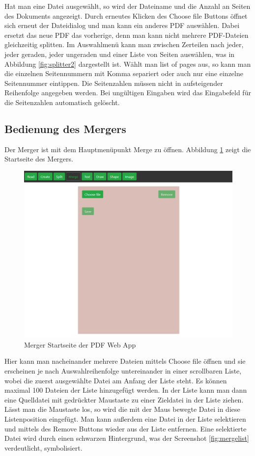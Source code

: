 Hat man eine Datei ausgewählt, so wird der Dateiname und die Anzahl an Seiten des Dokuments angezeigt. Durch erneutes Klicken des Choose file Buttons öffnet sich erneut der Dateidialog und man kann ein anderes PDF auswählen. Dabei ersetzt das neue PDF das vorherige, denn man kann nicht mehrere PDF-Dateien gleichzeitig splitten. Im Auswahlmenü kann man zwischen Zerteilen nach jeder, jeder geraden, jeder ungeraden und einer Liste von Seiten auswählen, was in Abbildung \ref{fig:splitter2} dargestellt ist. Wählt man list of pages aus, so kann man die einzelnen Seitennummern mit Komma separiert oder auch nur eine einzelne Seitennummer eintippen. Die Seitenzahlen müssen nicht in aufsteigender Reihenfolge angegeben werden. Bei ungültigen Eingaben wird das Eingabefeld für die Seitenzahlen automatisch gelöscht. 

\subsection{Bedienung des Mergers}
Der Merger ist mit dem Hauptmenüpunkt Merge zu öffnen. Abbildung \ref{fig:merger} zeigt die Startseite des Mergers. 

\begin{figure}[!htbp]
	\centering
	\includegraphics[width=1\textwidth]{"images/merger.png"}
	\caption{Merger Startseite der PDF Web App}
	\label{fig:merger}
\end{figure}

Hier kann man nacheinander mehrere Dateien mittels Choose file öffnen und sie erscheinen je nach Auswahlreihenfolge untereinander in einer scrollbaren Liste, wobei die zuerst ausgewählte Datei am Anfang der Liste steht. Es können maximal 100 Dateien der Liste hinzugefügt werden. In der Liste kann man dann eine Quelldatei mit gedrückter Maustaste zu einer Zieldatei in der Liste ziehen. Lässt man die Maustaste los, so wird die mit der Maus bewegte Datei in diese Listenposition eingefügt. Man kann außerdem eine Datei in der Liste selektieren und mittels des Remove Buttons wieder aus der Liste entfernen. Eine selektierte Datei wird durch einen schwarzen Hintergrund, was der Screenshot \ref{fig:mergelist} verdeutlicht, symbolisiert.

